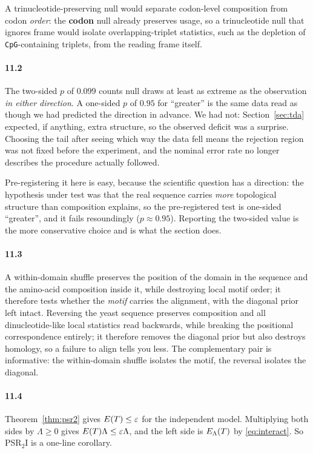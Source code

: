 A trinucleotide-preserving null would separate codon-level composition from
codon \emph{order}: the \textbf{codon} null already preserves usage, so a
trinucleotide null that ignores frame would isolate overlapping-triplet
statistics, such as the depletion of \texttt{CpG}-containing triplets, from the
reading frame itself.

\paragraph{11.2}
The two-sided $p$ of $0.099$ counts null draws at least as extreme as the
observation \emph{in either direction}. A one-sided $p$ of $0.95$ for ``greater''
is the same data read as though we had predicted the direction in advance. We
had not: Section~\ref{sec:tda} expected, if anything, extra structure, so the
observed deficit was a surprise. Choosing the tail after seeing which way the
data fell means the rejection region was not fixed before the experiment, and
the nominal error rate no longer describes the procedure actually followed.

Pre-registering it here is easy, because the scientific question has a
direction: the hypothesis under test was that the real sequence carries
\emph{more} topological structure than composition explains, so the
pre-registered test is one-sided ``greater'', and it fails resoundingly
($p \approx 0.95$). Reporting the two-sided value is the more conservative
choice and is what the section does.

\paragraph{11.3}
A within-domain shuffle preserves the position of the domain in the sequence and
the amino-acid composition inside it, while destroying local motif order; it
therefore tests whether the \emph{motif} carries the alignment, with the
diagonal prior left intact. Reversing the yeast sequence preserves composition
and all dinucleotide-like local statistics read backwards, while breaking the
positional correspondence entirely; it therefore removes the diagonal prior but
also destroys homology, so a failure to align tells you less. The complementary
pair is informative: the within-domain shuffle isolates the motif, the reversal
isolates the diagonal.

\paragraph{11.4}
Theorem~\ref{thm:psr2} gives $E(T) \le \varepsilon$ for the independent
model. Multiplying both sides by $\Lambda \ge 0$ gives
$E(T)\Lambda \le \varepsilon\Lambda$, and the left side is
$E_\Lambda(T)$ by \eqref{eq:interact}. So PSR$_2$I is a one-line
corollary.

